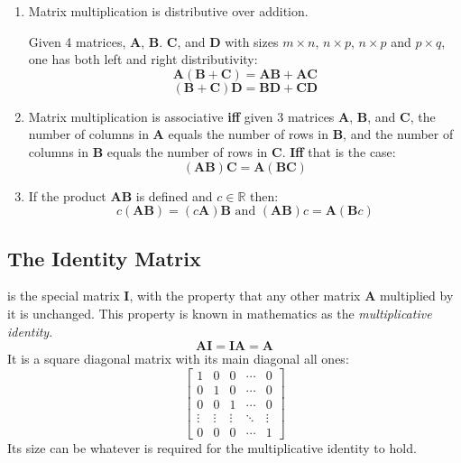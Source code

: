 \documentclass{tufte-book}
\begin{document}
\begin{enumerate}
	\item Matrix multiplication is distributive over addition.

	      Given 4 matrices, \textbf{A}, \textbf{B}. \textbf{C}, and \textbf{D} with sizes $m \times n$, $n \times p$, $n \times p$
	      and $p \times q$, one has both left and right distributivity:
	      \begin{equation*}
		      \textbf{A}(\textbf{B} + \textbf{C}) = \textbf{AB} + \textbf{AC}
	      \end{equation*}
	      \begin{equation*}
		      (\textbf{B} + \textbf{C})\textbf{D} = \textbf{BD} + \textbf{CD}
	      \end{equation*}

	\item Matrix multiplication is associative \textbf{iff} given 3 matrices \textbf{A}, \textbf{B}, and \textbf{C},
	      the number of columns in \textbf{A} equals the number of rows in \textbf{B}, and the number of columns in
	      \textbf{B} equals the number of rows in \textbf{C}. \textbf{Iff} that is the case:
	      \begin{equation*}
		      (\textbf{AB})\textbf{C} = \textbf{A}(\textbf{BC})
	      \end{equation*}

	\item If the product \textbf{AB} is defined and $c \in \mathbb{R}$ then:
	      \begin{equation*}
		      c(\textbf{AB})=(c\textbf{A})\textbf{B} \text{ and } (\textbf{AB})c = \textbf{A}(\textbf{B}c)
	      \end{equation*}
\end{enumerate}

\subsection{The Identity Matrix}

 is the special matrix \textbf{I}, with the property that any other matrix \textbf{A}
multiplied by it is unchanged. This property is known in mathematics as the \emph{multiplicative identity}.
\begin{equation*}
	\textbf{AI} = \textbf{IA} = \textbf{A}
\end{equation*}
It is a square diagonal matrix with its main diagonal all ones:
\begin{equation*}
	\begin{bmatrix}
		1      & 0      & 0      & \cdots & 0      \\
		0      & 1      & 0      & \cdots & 0      \\
		0      & 0      & 1      & \cdots & 0      \\
		\vdots & \vdots & \vdots & \ddots & \vdots \\
		0      & 0      & 0      & \cdots & 1
	\end{bmatrix}
\end{equation*}
Its size can be whatever is required for the multiplicative identity to hold.
\end{document}
